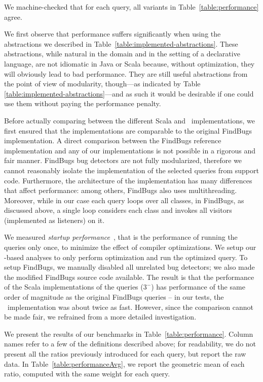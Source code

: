  We machine-checked that for each query, all variants in Table~\ref{table:performance} agree.

We first observe that performance suffers significantly when using the abstractions we described in Table~\ref{table:implemented-abstractions}. These abstractions, while natural in the domain and in the setting of a declarative language, are not idiomatic in Java or Scala because, without optimization, they
will obviously lead to bad performance. They are still useful abstractions from the point of view of modularity, though---as indicated by Table \ref{table:implemented-abstractions}---and as such it would be desirable if one could use them without paying the performance penalty.


Before actually comparing between the different Scala and \LoS\ implementations, we first ensured that the implementations are comparable to the original FindBugs implementation. A direct comparison between the FindBugs reference implementation and any of our implementations is not possible in a rigorous and fair manner. FindBugs bug detectors are not fully modularized, therefore we cannot reasonably isolate the implementation of the selected queries from support code. Furthermore, the architecture of the implementation has many differences that affect performance: among others, FindBugs also uses multithreading. Moreover, while in our case each query loops over all classes, in FindBugs, as discussed above, a single loop considers each class and invokes all visitors (implemented as listeners) on it.

We measured \emph{startup performance}~\citep{Georges07rigorousJavaPerformance}, that is the performance of running the queries only once, to minimize the effect of compiler optimizations.
We setup our \LoS-based analyses to only perform optimization and run the optimized query. To setup FindBugs, we manually disabled all unrelated bug detectors; we also made the modified FindBugs source code available. The result is that the performance of the Scala implementations of the queries ($3^-$) has performance of the same order of magnitude as the original FindBugs queries -- in our tests, the \LoS\ implementation was about twice as fast. However, since the comparison cannot be made fair, we refrained from a more detailed investigation.

We present the results of our benchmarks in Table~\ref{table:performance}.
Column names refer to a few of the definitions described above; for readability, we do not present all the ratios previously introduced for each query, but report the raw data.
In Table~\ref{table:performanceAvg}, we report the geometric mean \cite{Fleming86} of each ratio, computed with the same weight for each query.

